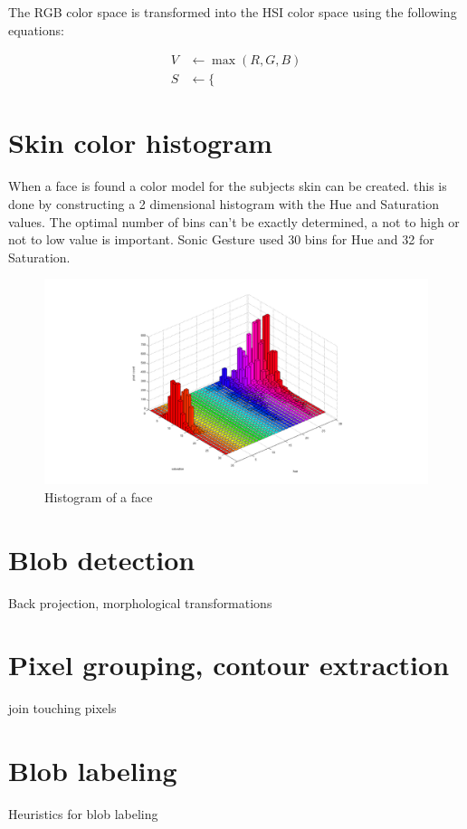  The RGB color space is transformed into the HSI color space using the following equations:

\begin{eqnarray*}
	V&\leftarrow \max(R,G,B) \label{first} \\
	S&\leftarrow \{
\end{eqnarray*}



\section{Skin color histogram}
When a face is found a color model for the subjects skin can be created. this is done by constructing a 2 dimensional histogram with the Hue and Saturation values. The optimal number of bins can't be exactly determined, a not to high or not to low value is important. 
Sonic Gesture used 30 bins for Hue and 32 for Saturation. 

\begin{figure}[htbp]
	\center
	\includegraphics[width=0.8\linewidth]{figures/face_hist.png}
	\caption{Histogram of a face}
	\label{fig:hsv}
\end{figure}



\section{Blob detection}
Back projection, morphological transformations

\section{Pixel grouping, contour extraction}
join touching pixels

\section{Blob labeling}
Heuristics for blob labeling

